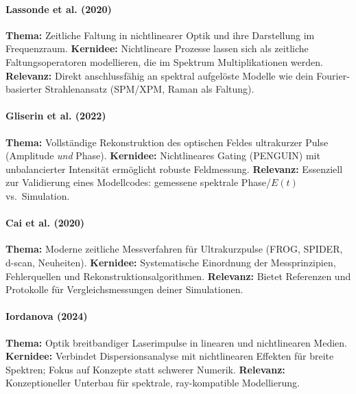 \paragraph{Lassonde et al. (2020) \cite{lassonde2020temporalconvolution}}
\textbf{Thema:} Zeitliche Faltung in nichtlinearer Optik und ihre Darstellung im Frequenzraum. 
\textbf{Kernidee:} Nichtlineare Prozesse lassen sich als zeitliche Faltungsoperatoren modellieren, die im Spektrum Multiplikationen werden. 
\textbf{Relevanz:} Direkt anschlussfähig an spektral aufgelöste Modelle wie dein Fourier-basierter Strahlenansatz (SPM/XPM, Raman als Faltung).

\paragraph{Gliserin et al. (2022) \cite{gliserin2022penguin}}
\textbf{Thema:} Vollständige Rekonstruktion des optischen Feldes ultrakurzer Pulse (Amplitude \emph{und} Phase). 
\textbf{Kernidee:} Nichtlineares Gating (PENGUIN) mit unbalancierter Intensität ermöglicht robuste Feldmessung. 
\textbf{Relevanz:} Essenziell zur Validierung eines Modellcodes: gemessene spektrale Phase/\(E(t)\) vs.\ Simulation.

\paragraph{Cai et al. (2020) \cite{cai2020temporalmeasurements}}
\textbf{Thema:} Moderne zeitliche Messverfahren für Ultrakurzpulse (FROG, SPIDER, d-scan, Neuheiten). 
\textbf{Kernidee:} Systematische Einordnung der Messprinzipien, Fehlerquellen und Rekonstruktionsalgorithmen. 
\textbf{Relevanz:} Bietet Referenzen und Protokolle für Vergleichsmessungen deiner Simulationen.

\paragraph{Iordanova (2024) \cite{iordanova2024broadband}}
\textbf{Thema:} Optik breitbandiger Laserimpulse in linearen und nichtlinearen Medien. 
\textbf{Kernidee:} Verbindet Dispersionsanalyse mit nichtlinearen Effekten für breite Spektren; Fokus auf Konzepte statt schwerer Numerik. 
\textbf{Relevanz:} Konzeptioneller Unterbau für spektrale, ray-kompatible Modellierung.




